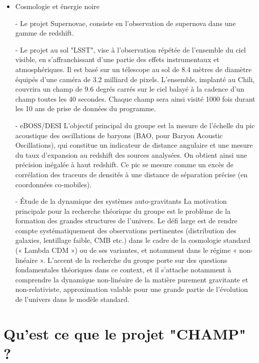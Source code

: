 \documentclass[french,a4paper,12pt]{report}
\begin{document}
\begin{itemize}
		\item Cosmologie et énergie noire
		
			- Le projet Supernovae, consiste en l'observation de supernova dans une gamme de redshift.
			
			- Le projet au sol "LSST", vise à l'observation répétée de l'ensemble du ciel visible, en s'affranchissant d'une partie des effets instrumentaux et atmosphériques. Il est basé sur un télescope au sol de 8.4 mètres de diamètre équipés d'une caméra de 3.2 milliard de pixels. L'ensemble, implanté au Chili, couvrira un champ de 9.6 degrés carrés sur le ciel balayé à la cadence d'un champ toutes les 40 secondes. Chaque champ sera ainsi visité 1000 fois durant les 10 ans de prise de données du programme.
			
			- eBOSS/DESI
			L’objectif principal du groupe est la mesure de l’échelle du pic acoustique des oscillations de baryons (BAO, pour Baryon Acoustic Oscillations), qui constitue un indicateur de distance angulaire et une mesure du taux d’expansion au redshift des sources analysées. On obtient ainsi une précision inégalée à haut redshift. Ce pic se mesure comme un excès de corrélation des traceurs de densités à une distance de séparation précise (en coordonnées co-mobiles).
			
			- Étude de la dynamique des systèmes auto-gravitants
			La motivation principale pour la recherche théorique du groupe est le problème de la formation des grandes structures de l’univers. Le défi large est de rendre compte systématiquement des observations pertinentes (distribution des galaxies, lentillage faible, CMB etc.) dans le cadre de la cosmologie standard (« Lambda CDM ») ou de ses variantes, et notamment dans le régime « non-linéaire ». L’accent de la recherche du groupe porte sur des questions fondamentales théoriques dans ce context, et il s’attache notamment à comprendre la dynamique non-linéaire de la matière purement gravitante et non-relativiste, approximation valable pour une grande partie de l’évolution de l’univers dans le modèle standard.		
		  	
  \end{itemize}
  
    
%
%
\part{Qu'est ce que le projet "CHAMP" ?}
\end{document}
